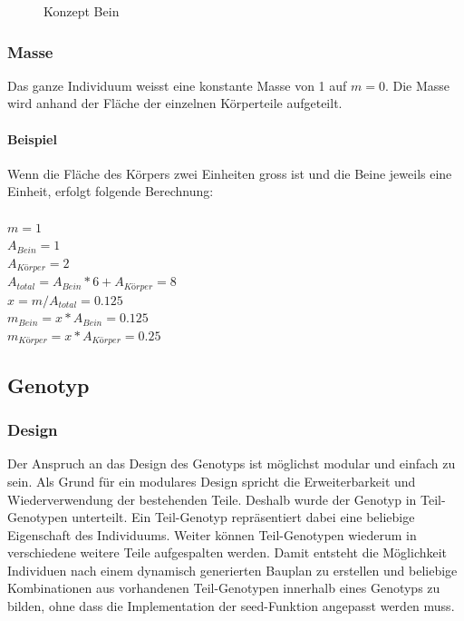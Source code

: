       \begin{figure}[H]
        \centering
        
        \caption{Konzept Bein\label{fig:conceptLeg}}
      \end{figure}

      \subsubsection{Masse\label{subs:Masse}}

        Das ganze Individuum weisst eine konstante Masse von 1 auf \(m = 0\).
        Die Masse wird anhand der Fläche der einzelnen Körperteile aufgeteilt.

      \paragraph{Beispiel\label{par:MasseExample}}

        Wenn die Fläche des Körpers zwei Einheiten gross ist und die Beine jeweils eine Einheit,
        erfolgt folgende Berechnung:
        \\
        \\
        \(m = 1\) \\
        \(A_{Bein} = 1\) \\
        \(A_{Körper} = 2\) \\
        \(A_{total} = A_{Bein} * 6 + A_{Körper} = 8 \) \\
        \( x = m / A_{total} = 0.125 \) \\
        \(m_{Bein} = x * A_{Bein} = 0.125\) \\
        \(m_{Körper} = x * A_{Körper} = 0.25\) \\

    \subsection{Genotyp\label{sub:Genotype}}

      \subsubsection{Design\label{subsub:GenotypeDesign}}

        Der Anspruch an das Design des Genotyps ist möglichst modular und einfach zu sein.
        Als Grund für ein modulares Design spricht die Erweiterbarkeit und Wiederverwendung der bestehenden Teile.
        Deshalb wurde der Genotyp in Teil-Genotypen unterteilt.
        Ein Teil-Genotyp repräsentiert dabei eine beliebige Eigenschaft des Individuums.
        Weiter können Teil-Genotypen wiederum in verschiedene weitere Teile aufgespalten werden.
        Damit entsteht die Möglichkeit Individuen nach einem dynamisch generierten Bauplan zu erstellen
        und beliebige Kombinationen aus vorhandenen Teil-Genotypen innerhalb eines Genotyps zu bilden,
        ohne dass die Implementation der seed-Funktion angepasst werden muss.

